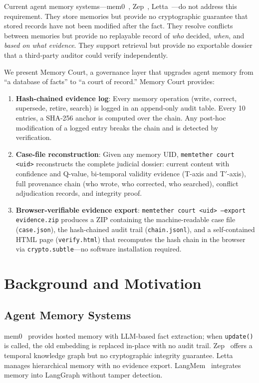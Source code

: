 \documentclass{article}
\begin{document}
Current agent memory systems---mem0~\cite{mem0}, Zep~\cite{zep}, Letta~\cite{letta}---do not address this requirement. They store memories but provide no cryptographic guarantee that stored records have not been modified after the fact. They resolve conflicts between memories but provide no replayable record of \emph{who} decided, \emph{when}, and \emph{based on what evidence}. They support retrieval but provide no exportable dossier that a third-party auditor could verify independently.

We present Memory Court, a governance layer that upgrades agent memory from ``a database of facts'' to ``a court of record.'' Memory Court provides:

\begin{enumerate}
\item \textbf{Hash-chained evidence log}: Every memory operation (write, correct, supersede, retire, search) is logged in an append-only audit table. Every 10 entries, a SHA-256 anchor is computed over the chain. Any post-hoc modification of a logged entry breaks the chain and is detected by verification.
\item \textbf{Case-file reconstruction}: Given any memory UID, \texttt{memtether court <uid>} reconstructs the complete judicial dossier: current content with confidence and Q-value, bi-temporal validity evidence (T-axis and T$'$-axis), full provenance chain (who wrote, who corrected, who searched), conflict adjudication records, and integrity proof.
\item \textbf{Browser-verifiable evidence export}: \texttt{memtether court <uid> --export evidence.zip} produces a ZIP containing the machine-readable case file (\texttt{case.json}), the hash-chained audit trail (\texttt{chain.jsonl}), and a self-contained HTML page (\texttt{verify.html}) that recomputes the hash chain in the browser via \texttt{crypto.subtle}---no software installation required.
\end{enumerate}

\section{Background and Motivation}

\subsection{Agent Memory Systems}

mem0~\cite{mem0} provides hosted memory with LLM-based fact extraction; when \texttt{update()} is called, the old embedding is replaced in-place with no audit trail. Zep~\cite{zep} offers a temporal knowledge graph but no cryptographic integrity guarantee. Letta~\cite{letta} manages hierarchical memory with no evidence export. LangMem~\cite{langmem} integrates memory into LangGraph without tamper detection.
\end{document}
